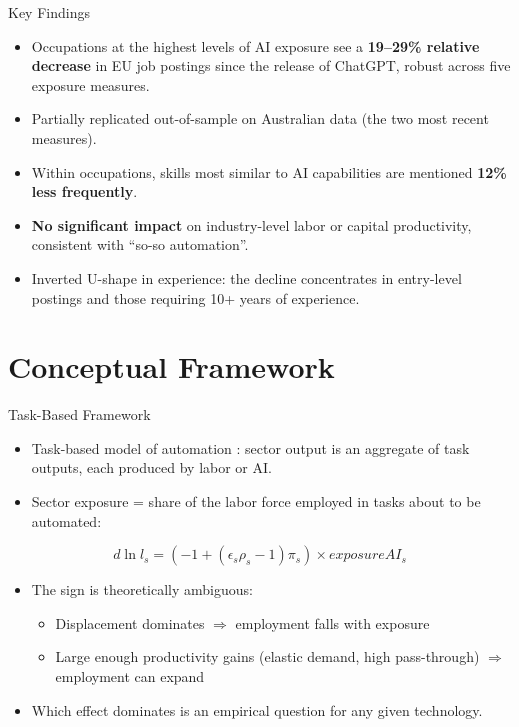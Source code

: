 \documentclass{beamer}
\begin{document}
\begin{frame}{Key Findings}
\begin{itemize}
    \item Occupations at the highest levels of AI exposure see a \textbf{19--29\% relative decrease} in EU job postings since the release of ChatGPT, robust across five exposure measures.
    \item Partially replicated out-of-sample on Australian data (the two most recent measures).
    \item Within occupations, skills most similar to AI capabilities are mentioned \textbf{12\% less frequently}.
    \item \textbf{No significant impact} on industry-level labor or capital productivity, consistent with ``so-so automation''.
    \item Inverted U-shape in experience: the decline concentrates in entry-level postings and those requiring 10+ years of experience.
\end{itemize}
\end{frame}

\section{Conceptual Framework}
\begin{frame}{Task-Based Framework}
\begin{itemize}
    \item Task-based model of automation \citep{zeira1998workers, acemoglu_restrepo_2022}: sector output is an aggregate of task outputs, each produced by labor or AI.
    \item Sector exposure = share of the labor force employed in tasks about to be automated:
\end{itemize}
\begin{equation*}
d\ln{l_s} = (-1 + (\epsilon_s\rho_s-1)\pi_s)\times exposureAI_s
\end{equation*}
\begin{itemize}
    \item The sign is theoretically ambiguous:
    \begin{itemize}
        \item Displacement dominates $\Rightarrow$ employment falls with exposure
        \item Large enough productivity gains (elastic demand, high pass-through) $\Rightarrow$ employment can expand
    \end{itemize}
    \item Which effect dominates is an empirical question for any given technology.
\end{itemize}
\end{frame}
\end{document}
